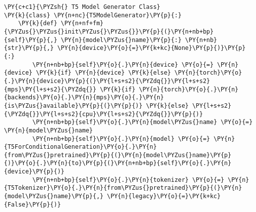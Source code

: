 \documentclass[11pt]{wseas}
\begin{document}
\begin{tcolorbox}[breakable, size=fbox, boxrule=1pt, pad at break*=1mm,colback=cellbackground, colframe=cellborder]
\begin{Verbatim}[commandchars=\\\{\}]
\PY{c+c1}{\PYZsh{} T5 Model Generator Class}
\PY{k}{class} \PY{n+nc}{T5ModelGenerator}\PY{p}{:}
    \PY{k}{def} \PY{n+nf+fm}{\PYZus{}\PYZus{}init\PYZus{}\PYZus{}}\PY{p}{(}\PY{n+nb+bp}{self}\PY{p}{,} \PY{n}{model\PYZus{}name}\PY{p}{:} \PY{n+nb}{str}\PY{p}{,} \PY{n}{device}\PY{o}{=}\PY{k+kc}{None}\PY{p}{)}\PY{p}{:}
        \PY{n+nb+bp}{self}\PY{o}{.}\PY{n}{device} \PY{o}{=} \PY{n}{device} \PY{k}{if} \PY{n}{device} \PY{k}{else} \PY{n}{torch}\PY{o}{.}\PY{n}{device}\PY{p}{(}\PY{l+s+s2}{\PYZdq{}}\PY{l+s+s2}{mps}\PY{l+s+s2}{\PYZdq{}} \PY{k}{if} \PY{n}{torch}\PY{o}{.}\PY{n}{backends}\PY{o}{.}\PY{n}{mps}\PY{o}{.}\PY{n}{is\PYZus{}available}\PY{p}{(}\PY{p}{)} \PY{k}{else} \PY{l+s+s2}{\PYZdq{}}\PY{l+s+s2}{cpu}\PY{l+s+s2}{\PYZdq{}}\PY{p}{)}
        \PY{n+nb+bp}{self}\PY{o}{.}\PY{n}{model\PYZus{}name} \PY{o}{=} \PY{n}{model\PYZus{}name}
        \PY{n+nb+bp}{self}\PY{o}{.}\PY{n}{model} \PY{o}{=} \PY{n}{T5ForConditionalGeneration}\PY{o}{.}\PY{n}{from\PYZus{}pretrained}\PY{p}{(}\PY{n}{model\PYZus{}name}\PY{p}{)}\PY{o}{.}\PY{n}{to}\PY{p}{(}\PY{n+nb+bp}{self}\PY{o}{.}\PY{n}{device}\PY{p}{)}
        \PY{n+nb+bp}{self}\PY{o}{.}\PY{n}{tokenizer} \PY{o}{=} \PY{n}{T5Tokenizer}\PY{o}{.}\PY{n}{from\PYZus{}pretrained}\PY{p}{(}\PY{n}{model\PYZus{}name}\PY{p}{,} \PY{n}{legacy}\PY{o}{=}\PY{k+kc}{False}\PY{p}{)}


\end{Verbatim}
\end{tcolorbox}
\end{document}
